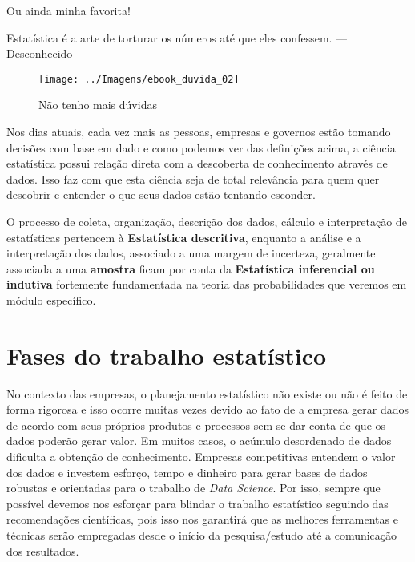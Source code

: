 \documentclass[12pt,]{style/krantz}
\renewenvironment{quote}{\begin{VF}}{\end{VF}}
\theoremstyle{definition}
\theoremstyle{definition}
\theoremstyle{definition}
\theoremstyle{remark}
\begin{document}
Ou ainda minha favorita!

\begin{quote}
Estatística é a arte de torturar os números até que eles confessem. ---
Desconhecido
\end{quote}

\begin{figure}[H]

{\centering \texttt{[image: ../Imagens/ebook\_duvida\_02]} 

}

\caption{Não tenho mais dúvidas}\label{fig:fig02}
\end{figure}

Nos dias atuais, cada vez mais as pessoas, empresas e governos estão
tomando decisões com base em dado e como podemos ver das definições
acima, a ciência estatística possui relação direta com a descoberta de
conhecimento através de dados. Isso faz com que esta ciência seja de
total relevância para quem quer descobrir e entender o que seus dados
estão tentando esconder.

O processo de coleta, organização, descrição dos dados, cálculo e
interpretação de estatísticas pertencem à \textbf{Estatística
descritiva}, enquanto a análise e a interpretação dos dados, associado a
uma margem de incerteza, geralmente associada a uma \textbf{amostra}
ficam por conta da \textbf{Estatística inferencial ou indutiva}
fortemente fundamentada na teoria das probabilidades que veremos em
módulo específico.

\section{Fases do trabalho
estatístico}\label{fases-do-trabalho-estatistico}

No contexto das empresas, o planejamento estatístico não existe ou não é
feito de forma rigorosa e isso ocorre muitas vezes devido ao fato de a
empresa gerar dados de acordo com seus próprios produtos e processos sem
se dar conta de que os dados poderão gerar valor. Em muitos casos, o
acúmulo desordenado de dados dificulta a obtenção de conhecimento.
Empresas competitivas entendem o valor dos dados e investem esforço,
tempo e dinheiro para gerar bases de dados robustas e orientadas para o
trabalho de \emph{Data Science}. Por isso, sempre que possível devemos
nos esforçar para blindar o trabalho estatístico seguindo das
recomendações científicas, pois isso nos garantirá que as melhores
ferramentas e técnicas serão empregadas desde o início da
pesquisa/estudo até a comunicação dos resultados.
\end{document}
